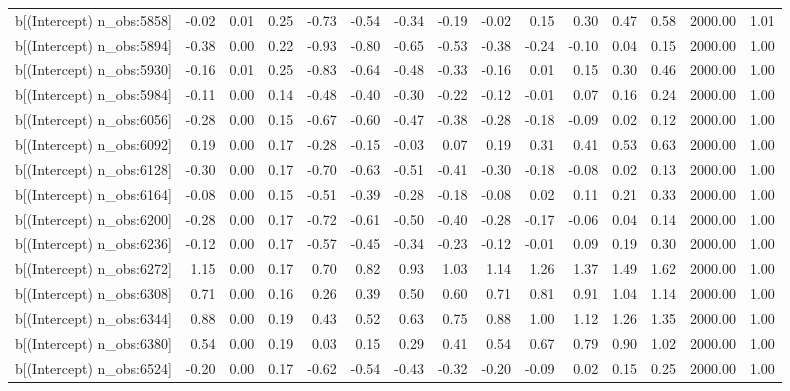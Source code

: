 \begin{table}[ht]
\begin{tabular}{rrrrrrrrrrrrrrr}
  b[(Intercept) n\_obs:5858] & -0.02 & 0.01 & 0.25 & -0.73 & -0.54 & -0.34 & -0.19 & -0.02 & 0.15 & 0.30 & 0.47 & 0.58 & 2000.00 & 1.01 \\ 
  b[(Intercept) n\_obs:5894] & -0.38 & 0.00 & 0.22 & -0.93 & -0.80 & -0.65 & -0.53 & -0.38 & -0.24 & -0.10 & 0.04 & 0.15 & 2000.00 & 1.00 \\ 
  b[(Intercept) n\_obs:5930] & -0.16 & 0.01 & 0.25 & -0.83 & -0.64 & -0.48 & -0.33 & -0.16 & 0.01 & 0.15 & 0.30 & 0.46 & 2000.00 & 1.00 \\ 
  b[(Intercept) n\_obs:5984] & -0.11 & 0.00 & 0.14 & -0.48 & -0.40 & -0.30 & -0.22 & -0.12 & -0.01 & 0.07 & 0.16 & 0.24 & 2000.00 & 1.00 \\ 
  b[(Intercept) n\_obs:6056] & -0.28 & 0.00 & 0.15 & -0.67 & -0.60 & -0.47 & -0.38 & -0.28 & -0.18 & -0.09 & 0.02 & 0.12 & 2000.00 & 1.00 \\ 
  b[(Intercept) n\_obs:6092] & 0.19 & 0.00 & 0.17 & -0.28 & -0.15 & -0.03 & 0.07 & 0.19 & 0.31 & 0.41 & 0.53 & 0.63 & 2000.00 & 1.00 \\ 
  b[(Intercept) n\_obs:6128] & -0.30 & 0.00 & 0.17 & -0.70 & -0.63 & -0.51 & -0.41 & -0.30 & -0.18 & -0.08 & 0.02 & 0.13 & 2000.00 & 1.00 \\ 
  b[(Intercept) n\_obs:6164] & -0.08 & 0.00 & 0.15 & -0.51 & -0.39 & -0.28 & -0.18 & -0.08 & 0.02 & 0.11 & 0.21 & 0.33 & 2000.00 & 1.00 \\ 
  b[(Intercept) n\_obs:6200] & -0.28 & 0.00 & 0.17 & -0.72 & -0.61 & -0.50 & -0.40 & -0.28 & -0.17 & -0.06 & 0.04 & 0.14 & 2000.00 & 1.00 \\ 
  b[(Intercept) n\_obs:6236] & -0.12 & 0.00 & 0.17 & -0.57 & -0.45 & -0.34 & -0.23 & -0.12 & -0.01 & 0.09 & 0.19 & 0.30 & 2000.00 & 1.00 \\ 
  b[(Intercept) n\_obs:6272] & 1.15 & 0.00 & 0.17 & 0.70 & 0.82 & 0.93 & 1.03 & 1.14 & 1.26 & 1.37 & 1.49 & 1.62 & 2000.00 & 1.00 \\ 
  b[(Intercept) n\_obs:6308] & 0.71 & 0.00 & 0.16 & 0.26 & 0.39 & 0.50 & 0.60 & 0.71 & 0.81 & 0.91 & 1.04 & 1.14 & 2000.00 & 1.00 \\ 
  b[(Intercept) n\_obs:6344] & 0.88 & 0.00 & 0.19 & 0.43 & 0.52 & 0.63 & 0.75 & 0.88 & 1.00 & 1.12 & 1.26 & 1.35 & 2000.00 & 1.00 \\ 
  b[(Intercept) n\_obs:6380] & 0.54 & 0.00 & 0.19 & 0.03 & 0.15 & 0.29 & 0.41 & 0.54 & 0.67 & 0.79 & 0.90 & 1.02 & 2000.00 & 1.00 \\ 
  b[(Intercept) n\_obs:6524] & -0.20 & 0.00 & 0.17 & -0.62 & -0.54 & -0.43 & -0.32 & -0.20 & -0.09 & 0.02 & 0.15 & 0.25 & 2000.00 & 1.00 \\ 

\end{tabular}
\end{table}
